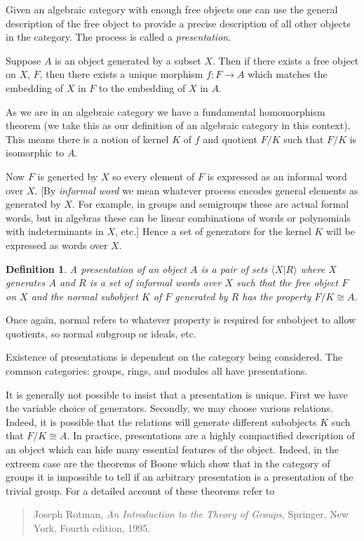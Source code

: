 \documentclass[12pt]{article}
\newtheorem{defn}[thm]{Definition}
\begin{document}
Given an algebraic category with enough free objects one can use the general
description of the free object to provide a precise description of all other
objects in the category.  The process is called a \emph{presentation}.

Suppose $A$ is an object generated by a subset $X$.  Then if there exists
a free object on $X$, $F$, then there exists a unique morphism 
$f:F\rightarrow A$ which matches the embedding of $X$ in $F$ to the embedding 
of $X$ in $A$.

As we are in an algebraic category we have a fundamental homomorphism theorem (we take this as our definition of an algebraic category in this context).
This means there is a notion of kernel $K$ of $f$ and quotient $F/K$ such that $F/K$ is isomorphic to $A$.

Now $F$ is generted by $X$ so every element of $F$ is expressed as an informal word over $X$.  [By \emph{informal word} we mean whatever process encodes
general elements as generated by $X$.  For example, in groups and semigroups these are actual formal words, but in algebras these can be linear combinations
of words or polynomials with indeterminants in $X$, etc.]  Hence a set of generators for the kernel $K$ will be expressed as words over $X$.

\begin{defn}
A presentation of an object $A$ is a pair of sets $\langle X|R\rangle$ where 
$X$ generates $A$ and $R$ is a set of informal words over $X$ such that 
the free object $F$ on $X$ and the normal subobject $K$ of $F$ generated by $R$
has the property $F/K\cong A$.
\end{defn}

Once again, normal refers to whatever property is required for subobject to allow quotients, so normal subgroup or ideals, etc.


Existence of presentations is dependent on the category being considered.
The common categories: groups, rings, and modules all have presentations.

It is generally not possible to insist that a presentation is unique.  First we have the variable choice of generators.  Secondly, we may choose various relations.  Indeed, it is possible that the relations will generate different subobjects $K$ such that $F/K\cong A$.  In practice, presentations are a highly compactified description of an object which can hide many essential features of the object.  Indeed, in the extreem case are the theorems of Boone which show that in the category of groups it is impossible to tell if an arbitrary presentation is a presentation of the trivial group.
For a detailed account of these theorems refer to 
\begin{quote}
Joseph Rotman, \emph{An Introduction to the Theory of Groups}, Springer, New  York,  Fourth edition, 1995.
\end{quote}

\end{document}
